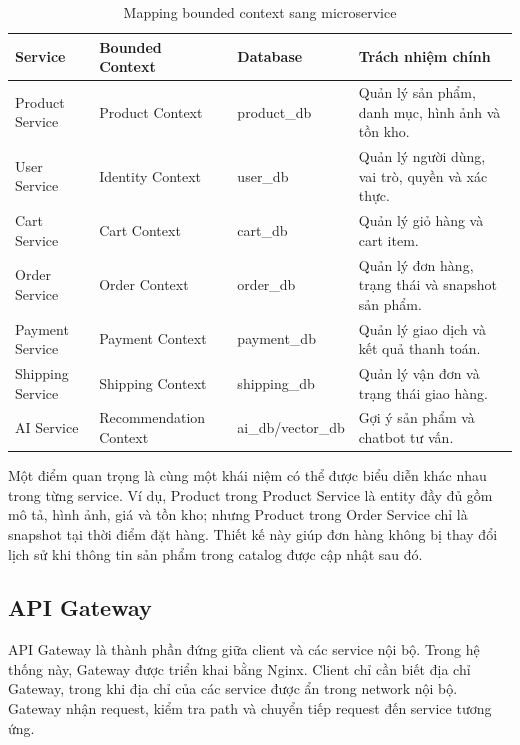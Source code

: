 \documentclass[../main.tex]{subfiles}
\begin{document}
\begin{table}[H]
    \centering
    \caption{Mapping bounded context sang microservice}
    \label{tab:chapter4-service-mapping}
    \begin{tabular}{|p{}|p{}|p{}|p{}|}
        \hline
        \rowcolor{primary!35}
        \textbf{Service} & \textbf{Bounded Context} & \textbf{Database} & \textbf{Trách nhiệm chính} \\
        \hline
        Product Service & Product Context & product\_db & Quản lý sản phẩm, danh mục, hình ảnh và tồn kho. \\
        \hline
        User Service & Identity Context & user\_db & Quản lý người dùng, vai trò, quyền và xác thực. \\
        \hline
        Cart Service & Cart Context & cart\_db & Quản lý giỏ hàng và cart item. \\
        \hline
        Order Service & Order Context & order\_db & Quản lý đơn hàng, trạng thái và snapshot sản phẩm. \\
        \hline
        Payment Service & Payment Context & payment\_db & Quản lý giao dịch và kết quả thanh toán. \\
        \hline
        Shipping Service & Shipping Context & shipping\_db & Quản lý vận đơn và trạng thái giao hàng. \\
        \hline
        AI Service & Recommendation Context & ai\_db/vector\_db & Gợi ý sản phẩm và chatbot tư vấn. \\
        \hline
    \end{tabular}
\end{table}

Một điểm quan trọng là cùng một khái niệm có thể được biểu diễn khác nhau trong từng service. Ví dụ, Product trong Product Service là entity đầy đủ gồm mô tả, hình ảnh, giá và tồn kho; nhưng Product trong Order Service chỉ là snapshot tại thời điểm đặt hàng. Thiết kế này giúp đơn hàng không bị thay đổi lịch sử khi thông tin sản phẩm trong catalog được cập nhật sau đó.

\subsection{API Gateway}
\label{subsection:4.2.3}

API Gateway là thành phần đứng giữa client và các service nội bộ. Trong hệ thống này, Gateway được triển khai bằng Nginx. Client chỉ cần biết địa chỉ Gateway, trong khi địa chỉ của các service được ẩn trong network nội bộ. Gateway nhận request, kiểm tra path và chuyển tiếp request đến service tương ứng.
\end{document}
